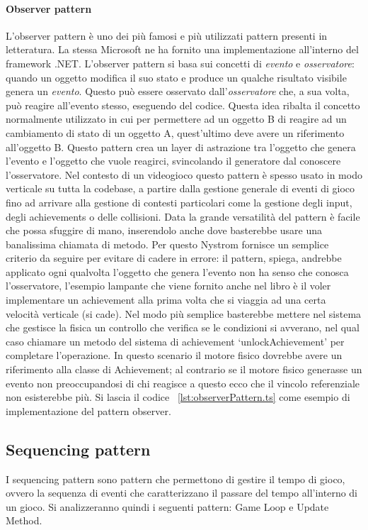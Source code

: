 \paragraph{Observer pattern}
L'observer pattern è uno dei più famosi e più utilizzati pattern presenti in
letteratura. La stessa Microsoft ne ha fornito una implementazione all'interno del framework 
.NET. L'observer pattern si basa sui concetti di \textit{evento} e \textit{osservatore}:
quando un oggetto modifica il suo stato e produce un qualche risultato visibile
genera un \textit{evento}. Questo può essere osservato dall'\textit{osservatore} 
che, a sua volta, può reagire all'evento stesso, eseguendo del codice. Questa idea
ribalta il concetto normalmente utilizzato in cui per permettere ad un oggetto B
di reagire ad un cambiamento di stato di un oggetto A, quest'ultimo deve avere
un riferimento all'oggetto B. Questo pattern crea un layer di astrazione tra l'oggetto
che genera l'evento e l'oggetto che vuole reagirci, svincolando il generatore dal
conoscere l'osservatore. Nel contesto di un videogioco questo pattern è spesso usato in modo
verticale su tutta la codebase, a partire dalla gestione generale di eventi di gioco fino ad arrivare
alla gestione di contesti particolari come la gestione degli input, degli achievements o delle
collisioni. Data la grande versatilità del pattern è facile che possa sfuggire di mano,
inserendolo anche dove basterebbe usare una banalissima chiamata di metodo. Per questo
Nystrom fornisce un semplice criterio da seguire per evitare di cadere in errore: 
il pattern, spiega, andrebbe applicato ogni qualvolta l'oggetto che genera l'evento
non ha senso che conosca l'osservatore, l'esempio lampante che viene fornito anche nel libro
è il voler implementare un achievement alla prima volta che si viaggia ad una certa
velocità verticale (si cade). Nel modo più semplice basterebbe mettere nel sistema che
gestisce la fisica un controllo che verifica se le condizioni si avverano, 
nel qual caso chiamare un metodo del sistema di achievement `unlockAchievement' per 
completare l'operazione. In questo scenario il motore fisico dovrebbe avere
un riferimento alla classe di Achievement; al contrario se il motore fisico
generasse un evento non preoccupandosi di chi reagisce a questo ecco che il vincolo
referenziale non esisterebbe più. Si lascia il codice ~\ref{lst:observerPattern.ts} come esempio
di implementazione del pattern observer.

\subsection{Sequencing pattern}\label{ssec:SequencingPattern}
I sequencing pattern sono pattern che permettono di gestire il tempo di gioco,
ovvero la sequenza di eventi che caratterizzano il passare del tempo all'interno
di un gioco. Si analizzeranno quindi i seguenti pattern: Game Loop e Update Method.

